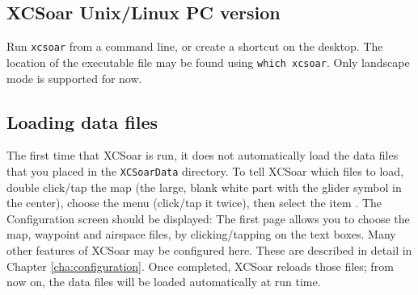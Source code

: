 \subsection*{XCSoar Unix/Linux PC version}
Run \verb|xcsoar| from a command line, or create a shortcut on the
desktop.  The location of the executable file may be found using
\verb|which xcsoar|.  Only landscape mode is  supported for now.

\subsection*{Loading data files}\label{sec:loaddatafiles}
The first time that XCSoar is run, it does not automatically load the 
data files that you placed in the \verb|XCSoarData| directory.  
To tell XCSoar which files to load, double click/tap the map (the large,
blank white part with the glider symbol in the center),
choose the menu  (click/tap it twice), then select the item 
\mbox{.}  The Configuration screen should be displayed:
The first page allows you to choose the map, 
waypoint and airspace files, by clicking/tapping on the text boxes.
Many other features of XCSoar may be configured here. These are described in detail in Chapter
\ref{cha:configuration}.
Once completed, XCSoar reloads those files; from now on, the data files
will be loaded automatically at run time.

